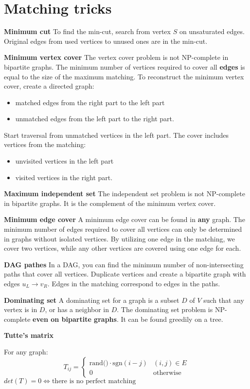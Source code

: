 \section{Matching tricks}
\textbf{Minimum cut}
To find the min-cut, search from vertex $S$ on unsaturated edges. 
Original edges from used vertices to unused ones are in the min-cut.

\textbf{Minimum vertex cover}
The vertex cover problem is not NP-complete in bipartite graphs. 
The minimum number of vertices required to cover all \textbf{edges} is equal to the size of the maximum matching. 
To reconstruct the minimum vertex cover, create a directed graph:

\begin{itemize}
\setlength\itemsep{0em}
\item matched edges from the right part to the left part
\item unmatched edges from the left part to the right part.
\end{itemize}

Start traversal from unmatched vertices in the left part.
The cover includes vertices from the matching:
\begin{itemize}
\setlength\itemsep{0em}
\item unvisited vertices in the left part
\item visited vertices in the right part.
\end{itemize}

\textbf{Maximum independent set}
The independent set problem is not NP-complete in bipartite graphs. 
It is the complement of the minimum vertex cover.

\textbf{Minimum edge cover}
A minimum edge cover can be found in \textbf{any} graph. 
The minimum number of edges required to cover all vertices can only be determined in graphs without isolated vertices.
By utilizing one edge in the matching, we cover two vertices, while any other vertices are covered using one edge for each.

\textbf{DAG pathes}
In a DAG, you can find the minimum number of non-intersecting paths that cover all vertices. 
Duplicate vertices and create a bipartite graph with edges $u_L \rightarrow v_R$. 
Edges in the matching correspond to edges in the paths.

\textbf{Dominating set}
A dominating set for a graph is a subset $D$ of $V$ such that any vertex is in $D$, or has a neighbor in $D$.
The dominating set problem is NP-complete \textbf{even on bipartite graphs}.
It can be found greedily on a tree.

\textbf{Tutte's matrix}

For any graph:
\[
T_{ij} = \begin{cases} 
      \text{rand()} \cdot \text{sgn}(i - j) & (i, j) \in E \\
      0 & \text{otherwise}
   \end{cases}
\]
$det(T) = 0 \iff \text{there is no perfect matching}$


\bigskip 
